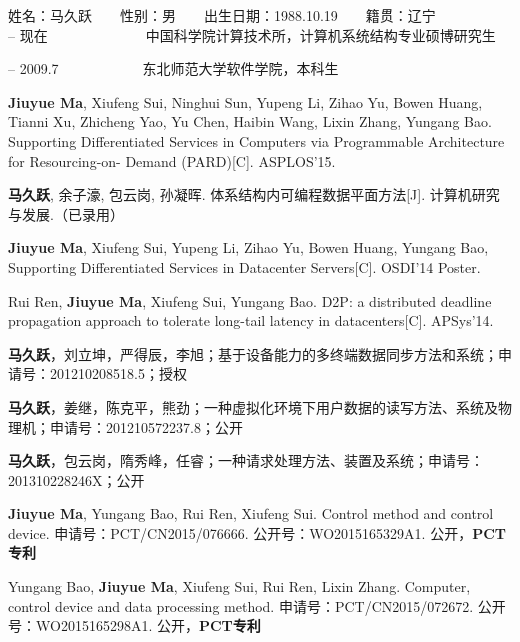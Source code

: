 \begin{resume}

\noindent
姓名：马久跃　　性别：男　　出生日期：1988.10.19　　籍贯：辽宁\\

 -- 现在　　　　　　　中国科学院计算技术所，计算机系统结构专业硕博研究生

 -- 2009.7　　　　　　东北师范大学软件学院，本科生\\

  \begin{enumerate}[leftmargin=1.5\parindent, nolistsep, label={[\arabic*]}]
    \item \textbf{Jiuyue Ma}, Xiufeng Sui, Ninghui Sun, Yupeng Li, Zihao Yu, Bowen Huang, Tianni Xu, Zhicheng Yao, Yu Chen, Haibin Wang, Lixin Zhang, Yungang Bao.
          Supporting Differentiated Services in Computers via Programmable Architecture for Resourcing-on- Demand (PARD)[C]. ASPLOS'15.
    \item \textbf{马久跃}, 余子濠, 包云岗, 孙凝晖. 体系结构内可编程数据平面方法[J]. 计算机研究与发展.（已录用）
    \item \textbf{Jiuyue Ma}, Xiufeng Sui, Yupeng Li, Zihao Yu, Bowen Huang, Yungang Bao, Supporting Differentiated Services in Datacenter Servers[C]. OSDI'14 Poster.
    \item Rui Ren, \textbf{Jiuyue Ma}, Xiufeng Sui, Yungang Bao. D2P: a distributed deadline propagation approach to tolerate long-tail latency in datacenters[C]. APSys'14.
  \end{enumerate}

  \begin{enumerate}[leftmargin=1.5\parindent, nolistsep, label={[\arabic*]}]
    \item \textbf{马久跃}，刘立坤，严得辰，李旭；基于设备能力的多终端数据同步方法和系统；申请号：201210208518.5；授权
    \item \textbf{马久跃}，姜继，陈克平，熊劲；一种虚拟化环境下用户数据的读写方法、系统及物理机；申请号：201210572237.8；公开
    \item \textbf{马久跃}，包云岗，隋秀峰，任睿；一种请求处理方法、装置及系统；申请号：201310228246X；公开
    \item  \textbf{Jiuyue Ma}, Yungang Bao, Rui Ren, Xiufeng Sui. Control method and control device. 申请号：PCT/CN2015/076666. 公开号：WO2015165329A1. 公开，\textbf{PCT专利}
    \item  Yungang Bao, \textbf{Jiuyue Ma}, Xiufeng Sui, Rui Ren, Lixin Zhang. Computer, control device and data processing method. 申请号：PCT/CN2015/072672. 公开号：WO2015165298A1. 公开，\textbf{PCT专利}
  \end{enumerate}


\end{resume}
